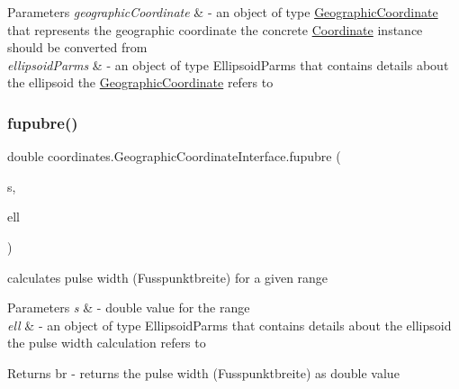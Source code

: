 \begin{DoxyParams}{Parameters}
{\em geographic\+Coordinate} & -\/ an object of type \hyperlink{classcoordinates_1_1_geographic_coordinate}{Geographic\+Coordinate} that represents the geographic coordinate the concrete \hyperlink{classcoordinates_1_1_coordinate}{Coordinate} instance should be converted from \\
\hline
{\em ellipsoid\+Parms} & -\/ an object of type Ellipsoid\+Parms that contains details about the ellipsoid the \hyperlink{classcoordinates_1_1_geographic_coordinate}{Geographic\+Coordinate} refers to \\
\hline
\end{DoxyParams}
\mbox{\label{classcoordinates_1_1_geographic_coordinate_interface_a221ccb34f7c04980aec4af015b1c2789}} 
\subsubsection{\texorpdfstring{fupubre()}{fupubre()}}
{\footnotesize\ttfamily double coordinates.\+Geographic\+Coordinate\+Interface.\+fupubre (\begin{DoxyParamCaption}\item[{double}]{s,  }\item[{\hyperlink{classparams_1_1_ellipsoid_parms}{Ellipsoid\+Parms}}]{ell }\end{DoxyParamCaption})}



calculates pulse width (Fusspunktbreite) for a given range 


\begin{DoxyParams}{Parameters}
{\em s} & -\/ double value for the range \\
\hline
{\em ell} & -\/ an object of type Ellipsoid\+Parms that contains details about the ellipsoid the pulse width calculation refers to \\
\hline
\end{DoxyParams}
\begin{DoxyReturn}{Returns}
br -\/ returns the pulse width (Fusspunktbreite) as double value 
\end{DoxyReturn}
\mbox{\label{classcoordinates_1_1_geographic_coordinate_interface_a1054ed7d1c0497e91fcc4f098c06e1e5}} 
